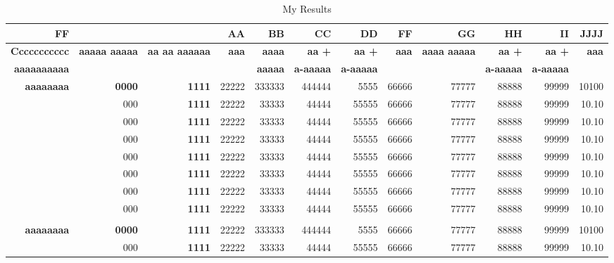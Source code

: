 \documentclass[9pt,article,twoside]{rmaa-rho-class/rmaa-rho}
\begin{document}
\begin{landscape}
\begin{table}[htbp]
  \centering\small
  \caption{My Results \label{tab:pwlstable}}
    \begin{tabular}{rrrrrrrrrrrr}
    \toprule
    \textbf{FF} & \textbf{} & \textbf{} & \textbf{AA} & \textbf{BB} & \textbf{CC} & \textbf{DD} & \textbf{FF} & \textbf{GG} & \textbf{HH} & \textbf{II} & \textbf{JJJJ} \\
    \midrule
    \textbf{Ccccccccccc} & \multirow{2}[2]{*}{\textbf{aaaaa aaaaa}} & \multirow{2}[2]{*}{\textbf{aa aa aaaaaa}} & \multirow{2}[2]{*}{\textbf{aaa}} & \textbf{aaaa} & \textbf{aa +} & \textbf{aa +} & \multirow{2}[2]{*}{\textbf{aaa}} & \multirow{2}[2]{*}{\textbf{aaaa aaaaa}} & \textbf{aa +} & \textbf{aa +} & \multirow{2}[2]{*}{\textbf{aaa}} \\
    \textbf{aaaaaaaaaa} &       &       &       & \textbf{aaaaa} & \textbf{a-aaaaa} & \textbf{a-aaaaa} &       &       & \textbf{a-aaaaa} & \textbf{a-aaaaa} &  \\
    \midrule
    \textbf{aaaaaaaa} & \textbf{0000} & \textbf{1111} & 22222 & 333333 & 444444 & 5555  & 66666 & 77777 & 88888 & 99999 & 10100 \\
          & 000   & \textbf{1111} & 22222 & 33333 & 44444 & 55555  & 66666 & 77777 & 88888 & 99999 & 10.10 \\
          & 000   & \textbf{1111} & 22222 & 33333 & 44444 & 55555  & 66666 & 77777 & 88888 & 99999 & 10.10 \\
          & 000   & \textbf{1111} & 22222 & 33333 & 44444 & 55555  & 66666 & 77777 & 88888 & 99999 & 10.10 \\
          & 000   & \textbf{1111} & 22222 & 33333 & 44444 & 55555  & 66666 & 77777 & 88888 & 99999 & 10.10 \\
          & 000   & \textbf{1111} & 22222 & 33333 & 44444 & 55555  & 66666 & 77777 & 88888 & 99999 & 10.10 \\
          & 000   & \textbf{1111} & 22222 & 33333 & 44444 & 55555  & 66666 & 77777 & 88888 & 99999 & 10.10 \\
          & 000   & \textbf{1111} & 22222 & 33333 & 44444 & 55555  & 66666 & 77777 & 88888 & 99999 & 10.10 \\\\
    \textbf{aaaaaaaa} & \textbf{0000} & \textbf{1111} & 22222 & 333333 & 444444 & 5555  & 66666 & 77777 & 88888 & 99999 & 10100 \\
          & 000   & \textbf{1111} & 22222 & 33333 & 44444 & 55555  & 66666 & 77777 & 88888 & 99999 & 10.10 \\

\end{tabular}
\end{table}
\end{landscape}
\end{document}
